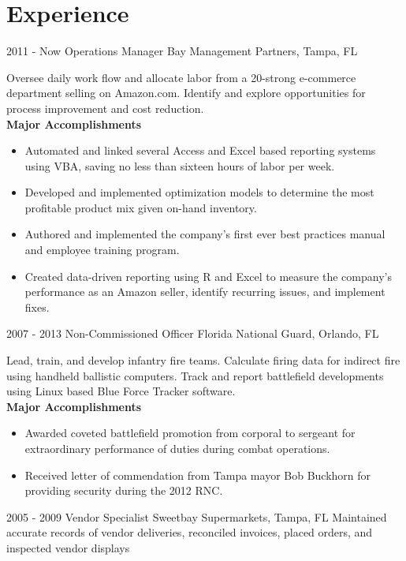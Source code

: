 \documentclass[]{friggeri-cv}
\begin{document}
\section{Experience}
\begin{entrylist}
  \entry
    {2011 - Now}
    {Operations Manager}
    {Bay Management Partners, Tampa, FL}
    {Oversee daily work flow and allocate labor from a 20-strong e-commerce department selling on Amazon.com.  Identify and explore opportunities for process improvement and cost reduction.\\
    \textbf{Major Accomplishments}
    \begin{itemize}
    \item Automated and linked several Access and Excel based reporting systems using VBA, saving no less than sixteen hours of labor per week.
    \item Developed and implemented optimization models to determine the most profitable product mix given on-hand inventory.
    \item Authored and implemented the company's first ever best practices manual and employee training program.
    \item Created data-driven reporting using R and Excel to measure the company's performance as an Amazon seller, identify recurring issues, and implement fixes.
    \end{itemize}
    }
  \entry
    {2007 - 2013}
    {Non-Commissioned Officer}
    {Florida National Guard, Orlando, FL}
    {Lead, train, and develop infantry fire teams.  Calculate firing data for indirect fire using handheld ballistic computers.  Track and report battlefield developments using Linux based Blue Force Tracker software.\\
    \textbf{Major Accomplishments}
    \begin{itemize}
    \item Awarded coveted battlefield promotion from corporal to sergeant for extraordinary performance of duties during combat operations.
    \item Received letter of commendation from Tampa mayor Bob Buckhorn for providing security during the 2012 RNC.
    \end{itemize}
    }
  \entry
    {2005 - 2009}
    {Vendor Specialist}
    {Sweetbay Supermarkets, Tampa, FL}
    {Maintained accurate records of vendor deliveries, reconciled invoices, placed orders, and inspected vendor displays\\}
\end{entrylist}
\end{document}
